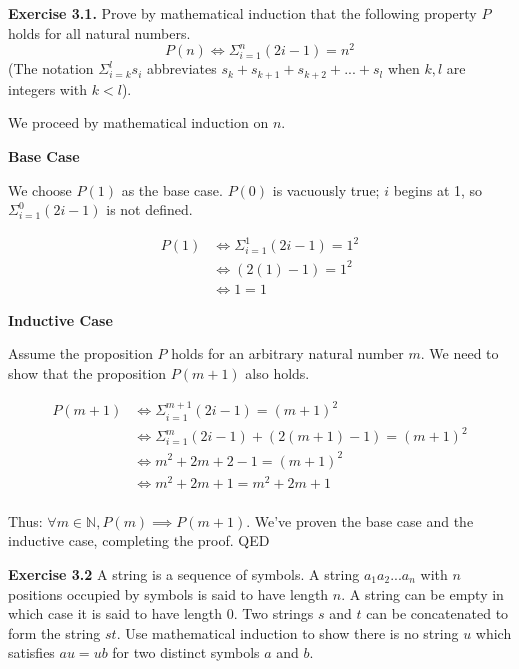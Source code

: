 \documentclass{article}
\begin{document}
  \newcommand{\N}{\mathbb{N}}

  \noindent \textbf{Exercise 3.1.} Prove by mathematical induction that the following property $P$ holds for all natural numbers.
  $$
  P(n) \iff \Sigma^n_{i = 1} (2i - 1) = n^2
  $$
  \noindent (The notation $\Sigma^l_{i = k} s_i$ abbreviates $s_k + s_{k + 1} + s_{k + 2} + ... + s_l$ when $k, l$ are integers with $k < l$).

  \bigskip
  \noindent We proceed by mathematical induction on $n$.

  \bigskip
  \noindent \textbf{Base Case}

  \medskip
  \noindent We choose $P(1)$ as the base case. $P(0)$ is vacuously true; $i$ begins at 1, so $\Sigma^0_{i = 1}(2i - 1)$ is not defined.

  \begin{align*}
    P(1) &\iff \Sigma^1_{i = 1}(2i - 1) = 1^2 \\
    &\iff (2(1) - 1) = 1^2 \\
    &\iff 1 = 1
  \end{align*}

  \bigskip
  \noindent \textbf{Inductive Case}

  \medskip
  \noindent Assume the proposition $P$ holds for an arbitrary natural number $m$. We need to show that the proposition $P(m + 1)$ also holds.

  \begin{align*}
    P(m + 1) &\iff \Sigma^{m + 1}_{i = 1}(2i - 1) = (m + 1)^2 \\
    &\iff \Sigma^{m}_{i = 1}(2i - 1) + (2(m + 1) - 1) = (m + 1)^2 \\
    &\iff m^2 + 2m + 2 - 1 = (m + 1)^2 \\
    &\iff m^2 + 2m + 1 = m^2 + 2m + 1 \\
  \end{align*}

  \noindent Thus: $\forall m \in \N, P(m) \implies P(m + 1)$. We've proven the base case and the inductive case, completing the proof. QED

  \bigskip
  \noindent \textbf{Exercise 3.2} A string is a sequence of symbols. A string $a_1a_2...a_n$ with $n$ positions occupied by symbols is said to have length $n$. A string can be empty in which case it is said to have length 0. Two strings $s$ and $t$ can be concatenated to form the string $st$. Use mathematical induction to show there is no string $u$ which satisfies $au = ub$ for two distinct symbols $a$ and $b$.
\end{document}
